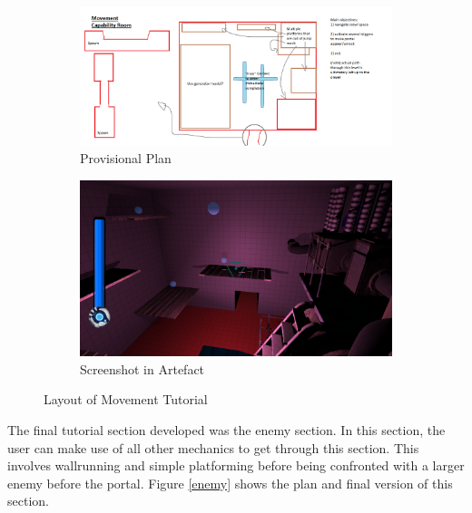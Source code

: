 \begin{figure}[H]
\centering
\begin{subfigure}{0.45\textwidth}
  \centering
  \includegraphics[width=1\linewidth]{Figures/mcapplan.png}
  \caption{Provisional Plan}
\end{subfigure}%
\begin{subfigure}{0.45\textwidth}
  \centering
  \includegraphics[width=1\linewidth]{Figures/mcap.png}
  \caption{Screenshot in Artefact}
\end{subfigure}
\caption{Layout of Movement Tutorial}
\label{moves}
\end{figure}

\noindent The final tutorial section developed was the enemy section. In this section, the user can make use of all other mechanics to get through this section. This involves wallrunning and simple platforming before being confronted with a larger enemy before the portal. Figure \ref{enemy} shows the plan and final version of this section.

